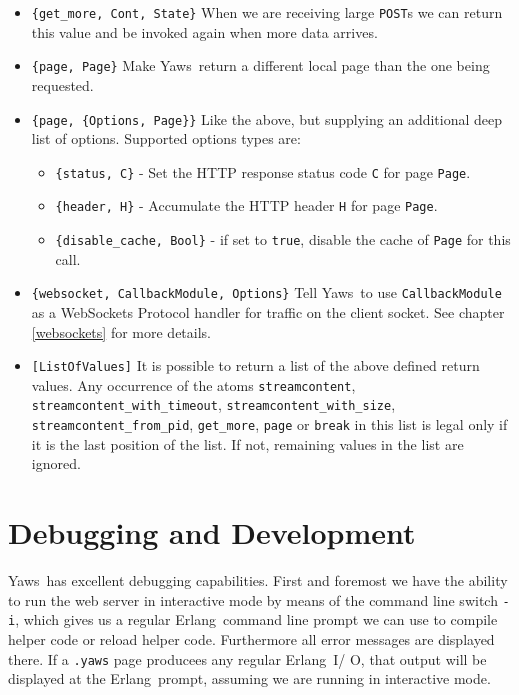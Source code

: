 \documentclass[11pt,oneside,english]{book}
\newcommand{\Erlang}            %
        {{\sc Erlang}}
\newcommand{\Yaws}            %
        {{\sc Yaws}}
\begin{document}
\begin{itemize}
\item \verb+{get_more, Cont, State}+ When we are receiving large
  \verb+POST+s we can return this value and be invoked again when more
  data arrives.

\item \verb+{page, Page}+ Make \Yaws\ return a different local page
  than the one being requested.

\item \verb+{page, {Options, Page}}+ Like the above, but supplying an
  additional deep list of options.  Supported options types are:

  \begin{itemize}
    \item \verb+{status, C}+ - Set the HTTP response status code \verb+C+ for
      page \verb+Page+.
    \item \verb+{header, H}+ - Accumulate the HTTP header \verb+H+ for page
      \verb+Page+.
    \item \verb+{disable_cache, Bool}+ - if set to \verb+true+, disable the
      cache of \verb+Page+ for this call.
  \end{itemize}

\item \verb+{websocket, CallbackModule, Options}+ Tell \Yaws\  to use
  \verb+CallbackModule+ as a WebSockets Protocol handler for traffic
  on the client socket. See chapter \ref{websockets} for more details.

\item \verb+[ListOfValues]+ It is possible to return a list of the above defined
  return values. Any occurrence of the atoms \verb+streamcontent+,
  \verb+streamcontent_with_timeout+,
  \verb+streamcontent_with_size+,\\
  \verb+streamcontent_from_pid+, \verb+get_more+, \verb+page+ or \verb+break+ in
  this list is legal only if it is the last position of the list. If not,
  remaining values in the list are ignored.

\end{itemize}



\chapter{Debugging and Development}

\Yaws\ has excellent debugging capabilities. First and foremost we
have the ability to run the web server in interactive mode by means of
the command line switch \verb+-i+, which gives us a regular
\Erlang\ command line prompt we can use to compile helper code or
reload helper code. Furthermore all error messages are displayed
there.  If a \verb+.yaws+ page producees any regular \Erlang\ I\slash
O, that output will be displayed at the \Erlang\ prompt, assuming we
are running in interactive mode.
\end{document}
